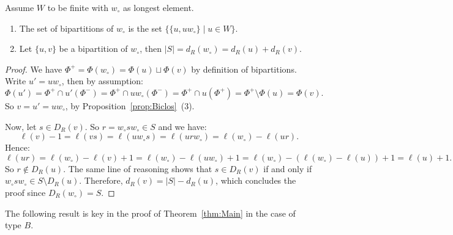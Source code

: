 \documentclass[ALCO,Unicode]{cedram}
\theoremstyle{definition}
\begin{document}
\begin{prop}\label{prop:Longest} Assume $W$ to be finite with $w_\circ$ as longest element.
\begin{enumerate} 
\item The set of bipartitions of $w_\circ$ is the set $\{\{u,uw_\circ\}\mid u\in W\}$.
\item Let  $\{u,v\}$ be a bipartition of  $w_\circ$, then 
$
|S|=d_R(w_\circ)=d_R(u)+d_R(v).
$
\end{enumerate}
\end{prop}
\begin{proof} We have $\Phi^+=\Phi(w_\circ)=\Phi(u)\sqcup \Phi(v)$ by definition of bipartitions. Write $u'=uw_\circ $, then by assumption: 
$$
\Phi(u')=\Phi^+\cap u'(\Phi^-)= \Phi^+\cap uw_\circ(\Phi^-)= \Phi^+\cap u(\Phi^+)=\Phi^+\setminus \Phi(u)=\Phi(v).
$$
So $v=u'=uw_\circ$, by Proposition~\ref{prop:Biclos}~(3). 

Now, let $s\in D_R(v)$. So $r=w_\circ s w_\circ \in S$ and we have:
$$
\ell(v)-1= \ell(vs)=\ell(uw_\circ s)=\ell(ur w_\circ)= \ell(w_\circ)-\ell(ur).
$$
Hence:
$$
\ell(ur)=\ell(w_\circ) - \ell(v)+1=\ell(w_\circ) - \ell(uw_\circ)+1=\ell(w_\circ) - (\ell(w_\circ)-\ell(u))+1=\ell(u)+1.
$$
So $r\notin D_R(u)$. The same line of reasoning shows that $s\in D_R(v)$ if and only if $w_\circ s w_\circ \in S\setminus D_R(u)$. Therefore, $d_R(v)=|S|-d_R(u)$, which concludes the proof since $D_R(w_\circ)=S$.
\end{proof}

The following result is key in the proof of Theorem~\ref{thm:Main} in the case of type $B$.
\end{document}
